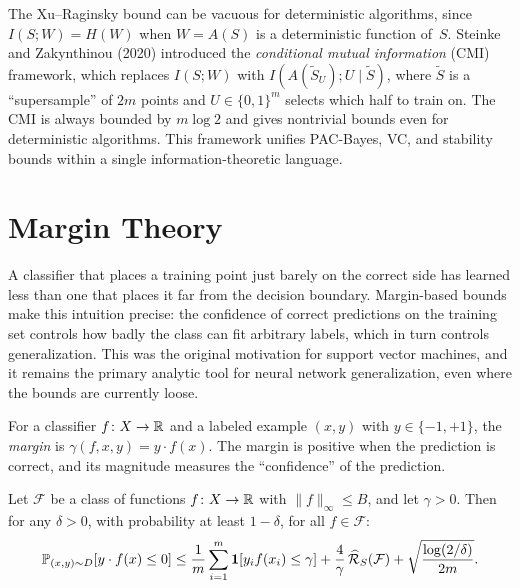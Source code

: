 \begin{remark}
\label{rmk:cmi}
The Xu--Raginsky bound can be vacuous for deterministic algorithms,
since $I(S; W) = H(W)$ when $W = A(S)$ is a deterministic function
of~$S$.  Steinke and Zakynthinou (2020) introduced the \emph{conditional
mutual information} (CMI) framework, which replaces $I(S; W)$ with
$I(A(\tilde{S}_U); U \mid \tilde{S})$, where $\tilde{S}$ is a
``supersample'' of $2m$ points and $U \in \{0,1\}^m$ selects which half
to train on.  The CMI is always bounded by $m \log 2$ and gives
nontrivial bounds even for deterministic algorithms.  This framework
unifies PAC-Bayes, VC, and stability bounds within a single
information-theoretic language.
\end{remark}



\section{Margin Theory}
\label{sec:margin}

A classifier that places a training point just barely on the correct side has learned less than one that places it far from the decision boundary. Margin-based bounds make this intuition precise: the confidence of correct predictions on the training set controls how badly the class can fit arbitrary labels, which in turn controls generalization. This was the original motivation for support vector machines, and it remains the primary analytic tool for neural network generalization, even where the bounds are currently loose.

\begin{defn}[Margin]
\label{def:margin}
For a classifier $f \colon X \to \mathbb{R}$ and a labeled example $(x, y)$
with $y \in \{-1, +1\}$, the \emph{margin} is
$\gamma(f, x, y) = y \cdot f(x)$.  The margin is positive when the
prediction is correct, and its magnitude measures the ``confidence'' of
the prediction.
\end{defn}

\begin{thm}
\label{thm:margin-bound}
Let $\mathcal{F}$ be a class of functions $f \colon X \to \mathbb{R}$ with
$\|f\|_\infty \leq B$, and let $\gamma > 0$.  Then for any $\delta > 0$,
with probability at least $1 - \delta$, for all $f \in \mathcal{F}$:
\[
  \mathbb{P}_{(x,y) \sim D}[y \cdot f(x) \leq 0]
  \leq \frac{1}{m}\sum_{i=1}^m \mathbf{1}[y_i f(x_i) \leq \gamma]
  + \frac{4}{\gamma}\,\widehat{\mathcal{R}}_S(\mathcal{F})
  + \sqrt{\frac{\log(2/\delta)}{2m}}.
\]
\end{thm}

